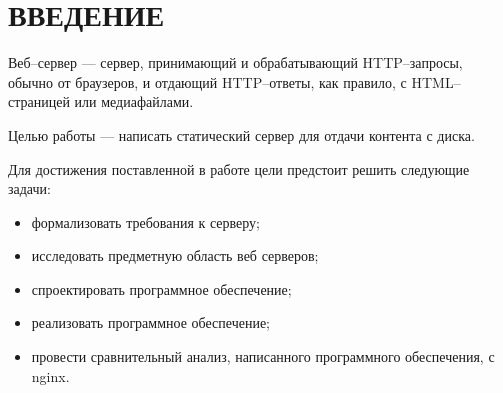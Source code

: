 \chapter*{ВВЕДЕНИЕ}

Веб--сервер --- сервер, принимающий и обрабатывающий HTTP--запросы, обычно от браузеров, и отдающий HTTP--ответы, как правило, с HTML--страницей или медиафайлами.

Целью работы --- написать статический сервер для отдачи контента с диска.

Для достижения поставленной в работе цели предстоит решить следующие задачи:
\begin{itemize}[label=---]
	\item формализовать требования к серверу;
	\item исследовать предметную область веб серверов;
	\item спроектировать программное обеспечение;
	\item реализовать программное обеспечение;
	\item провести сравнительный анализ, написанного программного обеспечения, с nginx.
\end{itemize}



